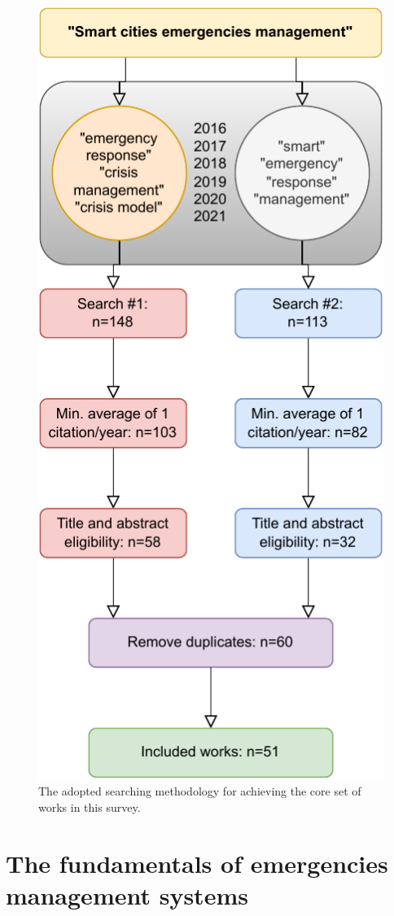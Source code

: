 \begin{refsection}
\begin{figure}[htb]
  \centering
  \includegraphics{Chapters/1-Survey/images/fluxograma.pdf}
  \caption{The adopted searching methodology for achieving the core set of works in this survey.}\label{fig:workflow}
\end{figure}

\section {The fundamentals of emergencies management systems}\label{sec3}


\end{refsection}
